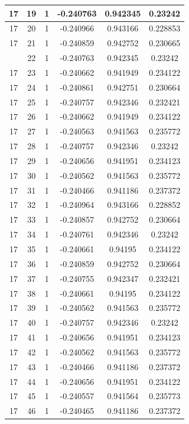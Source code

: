 \documentclass[12pt,a4paper]{article}
\numberwithin{equation}{section}
\numberwithin{figure}{section}
\numberwithin{table}{section}
\begin{document}
\begin{longtable}{|c|c|c|c|c|c|}
17 & 19 & 1 & -0.240763 & 0.942345 & 0.23242 \\ \hline
17 & 20 & 1 & -0.240966 & 0.943166 & 0.228853 \\ \hline
17 & 21 & 1 & -0.240859 & 0.942752 & 0.230665 \\ \hline
\pagebreak
17 & 22 & 1 & -0.240763 & 0.942345 & 0.23242 \\ \hline
17 & 23 & 1 & -0.240662 & 0.941949 & 0.234122 \\ \hline
17 & 24 & 1 & -0.240861 & 0.942751 & 0.230664 \\ \hline
17 & 25 & 1 & -0.240757 & 0.942346 & 0.232421 \\ \hline
17 & 26 & 1 & -0.240662 & 0.941949 & 0.234122 \\ \hline
17 & 27 & 1 & -0.240563 & 0.941563 & 0.235772 \\ \hline
17 & 28 & 1 & -0.240757 & 0.942346 & 0.23242 \\ \hline
17 & 29 & 1 & -0.240656 & 0.941951 & 0.234123 \\ \hline
17 & 30 & 1 & -0.240562 & 0.941563 & 0.235772 \\ \hline
17 & 31 & 1 & -0.240466 & 0.941186 & 0.237372 \\ \hline
17 & 32 & 1 & -0.240964 & 0.943166 & 0.228852 \\ \hline
17 & 33 & 1 & -0.240857 & 0.942752 & 0.230664 \\ \hline
17 & 34 & 1 & -0.240761 & 0.942346 & 0.23242 \\ \hline
17 & 35 & 1 & -0.240661 & 0.94195 & 0.234122 \\ \hline
17 & 36 & 1 & -0.240859 & 0.942752 & 0.230664 \\ \hline
17 & 37 & 1 & -0.240755 & 0.942347 & 0.232421 \\ \hline
17 & 38 & 1 & -0.240661 & 0.94195 & 0.234122 \\ \hline
17 & 39 & 1 & -0.240562 & 0.941563 & 0.235772 \\ \hline
17 & 40 & 1 & -0.240757 & 0.942346 & 0.23242 \\ \hline
17 & 41 & 1 & -0.240656 & 0.941951 & 0.234123 \\ \hline
17 & 42 & 1 & -0.240562 & 0.941563 & 0.235772 \\ \hline
17 & 43 & 1 & -0.240466 & 0.941186 & 0.237372 \\ \hline
17 & 44 & 1 & -0.240656 & 0.941951 & 0.234122 \\ \hline
17 & 45 & 1 & -0.240557 & 0.941564 & 0.235773 \\ \hline
17 & 46 & 1 & -0.240465 & 0.941186 & 0.237372 \\ \hline

\end{longtable}
\end{document}

